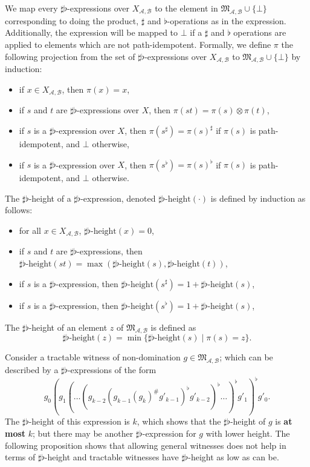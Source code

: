 \documentclass{lmcs}
\theoremstyle{remark}
\newcommand{\ideal}{\mathfrak{M}}
\newcommand{\autA}{\mathcal{A}}
\newcommand{\autB}{\mathcal{B}}
\theoremstyle{remark}
\begin{document}
We map every $\sharp\flat$-expressions over $X_{\autA, \autB}$ to the element in $\ideal_{\autA,\autB}\cup \{\bot\}$ corresponding to doing the product, $\sharp$ and $\flat$-operations as in the expression. Additionally, the expression will be mapped to $\bot$ if a $\sharp$ and $\flat$ operations are applied to elements which are not path-idempotent. Formally, we define $\pi$ the following projection from the set of $\sharp\flat$-expressions over $X_{\autA,\autB}$ to $\ideal_{\autA,\autB}\cup \{\bot\}$ by induction:
\begin{itemize}
\item if $x \in X_{\autA,\autB}$, then $\pi(x) = x$,
\item if $s$ and $t$ are $\sharp\flat$-expressions over $X$, then $\pi(st) = \pi(s)\otimes \pi(t)$,
\item if $s$ is a $\sharp\flat$-expression over $X$, then $\pi(s^\sharp) = \pi(s)^\sharp$ if $\pi(s)$ is path-idempotent, and $\bot$ otherwise,
\item if $s$ is a $\sharp\flat$-expression over $X$, then $\pi(s^\flat) = \pi(s)^\flat$ if $\pi(s)$ is path-idempotent, and $\bot$ otherwise.
\end{itemize}


\newcommand{\sfh}[1]{\sharp\flat\text{-height}(#1)}

\begin{defi}
The $\sharp\flat$-height of a $\sharp\flat$-expression, denoted $\sfh{\cdot}$ is defined by induction as follows:
\begin{itemize}
\item for all $x \in X_{\autA,\autB}$, $\sfh{x} = 0$,
\item if $s$ and $t$ are $\sharp\flat$-expressions, then $\sfh{st} = \max(\sfh{s},\sfh{t})$,
\item if $s$ is a $\sharp\flat$-expression, then $\sfh{s^\sharp} = 1+ \sfh{s}$,
\item if $s$ is a $\sharp\flat$-expression, then $\sfh{s^\flat} = 1+ \sfh{s}$,
\end{itemize} 
\end{defi}


\begin{defi}
\label{defi:sfheightelement}
The $\sharp\flat$-height of an element $z$ of $\ideal_{\autA,\autB}$ is defined as 
$$\sharp\flat\text{-height}(z) = \min\{\sfh{s}\mid\pi(s)=z\}.$$
\end{defi}

Consider a tractable witness of non-domination $g\in \ideal_{\autA,\autB}$; which can be described by a $\sharp\flat$-expressions of the form
\begin{equation*}\label{eq:sftractable}g_0 (g_1 (\dots (g_{k-2} ( g_{k-1} (g_{k})^\#g'_{k-1})^\flat g'_{k-2})^\flat \dots)^\flat g'_{1})^\flat g'_{0}.\end{equation*} 
The $\sharp\flat$-height of this expression is $k$, which shows that the $\sharp\flat$-height of $g$ is \textbf{at most} $k$; but there may be another $\sharp\flat$-expression for $g$ with lower height. The following proposition shows that allowing general witnesses does not help in terms of $\sharp\flat$-height and tractable witnesses have $\sharp\flat$-height as low as can be.
\end{document}
